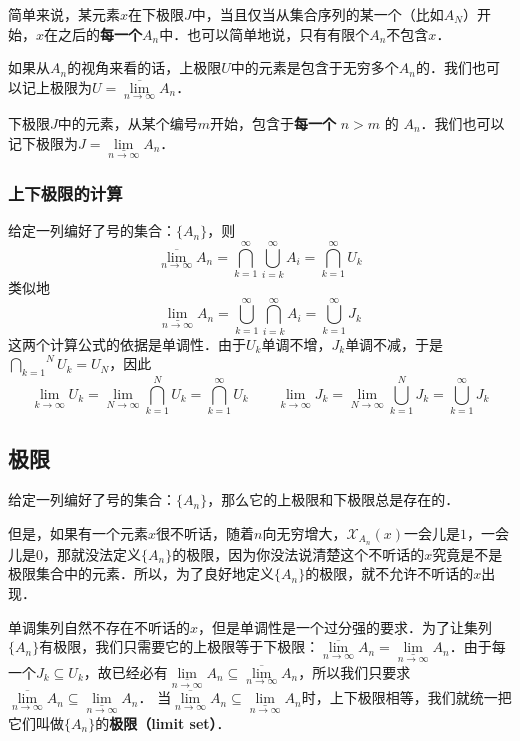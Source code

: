 简单来说，某元素$x$在下极限$J$中，当且仅当从集合序列的某一个（比如$A_N$）开始，$x$在之后的\textbf{每一个}$A_n$中．也可以简单地说，只有有限个$A_n$不包含$x$．

如果从$A_n$的视角来看的话，上极限$U$中的元素是包含于无穷多个$A_n$的．我们也可以记上极限为$U=\underset{n\to \infty}{\overline{\lim}} A_n$．

下极限$J$中的元素，从某个编号$m$开始，包含于\textbf{每一个} $n>m$ 的 $A_n$．我们也可以记下极限为$J=\underset{n\to \infty}{\underline{\lim}}A_n$．

\subsubsection{上下极限的计算}
给定一列编好了号的集合：$\{A_n\}$，则
\begin{equation}
\underset{n\to \infty}{\overline{\lim}} A_n = \overset {\infty}{\underset{k=1}{\bigcap}} \overset{\infty}{\underset{i=k}{\bigcup}} A_i = \overset{\infty}{\underset{k=1}{\bigcap}} U_k
\end{equation}
类似地
\begin{equation}
\underset{n\to \infty}{\underline{\lim}}A_n=\overset{\infty}{\underset{k=1}{\bigcup}}\overset{\infty}{\underset{i=k}{\bigcap}} A_i=\overset{\infty} {\underset{k=1}{\bigcup}} J_k
\end{equation}
这两个计算公式的依据是单调性．由于$U_k$单调不增，$J_k$单调不减，于是 $\displaystyle \overset{N}{\underset{k=1}{\bigcap}}U_k=U_N$，因此
\begin{equation}
\lim_{k\to\infty}U_k=\lim\limits_{N\to\infty}\overset{N}{\underset{k=1}{\bigcap}} U_k=\overset{\infty}{\underset{k=1}{\bigcap}}U_k
\qquad
\lim\limits_{k\to\infty}J_k=\lim\limits_{N\to\infty}\overset{N}{\underset{k=1}{\bigcup}} J_k=\overset{\infty}{\underset{k=1}{\bigcup}} J_k
\end{equation}

\subsection{极限}
给定一列编好了号的集合：$\{A_n\}$，那么它的上极限和下极限总是存在的．

但是，如果有一个元素$x$很不听话，随着$n$向无穷增大，$\mathcal{X}_{A_n}(x)$一会儿是$1$，一会儿是$0$，那就没法定义$\{A_n\}$的极限，因为你没法说清楚这个不听话的$x$究竟是不是极限集合中的元素．所以，为了良好地定义$\{A_n\}$的极限，就不允许不听话的$x$出现．

单调集列自然不存在不听话的$x$，但是单调性是一个过分强的要求．为了让集列$\{A_n\}$有极限，我们只需要它的上极限等于下极限：$\underset{n\to \infty}{\overline{\lim}} A_n=\underset{n\to \infty}{\underline{\lim}} A_n$．由于每一个$J_k\subseteq U_k$，故已经必有$\underset{n\to \infty}{\underline{\lim}} A_n\subseteq \underset{n\to \infty}{\overline{\lim}} A_n$，所以我们只要求$\underset{n\to \infty}{\overline{\lim}}A_n\subseteq \underset{n\to \infty}{\underline{\lim}} A_n$．
当$\underset{n\to \infty}{\overline{\lim}} A_n\subseteq \underset{n\to \infty}{\underline{\lim}} A_n$时，上下极限相等，我们就统一把它们叫做$\{A_n\}$的\textbf{极限（limit set）}．
